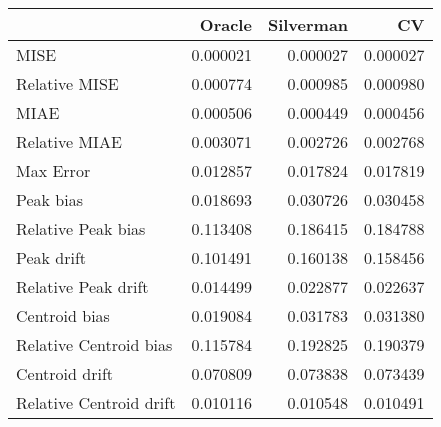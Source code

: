 \begin{tabular}{lrrr}
  \hline
 & Oracle & Silverman & CV \\ 
  \hline
MISE & 0.000021 & 0.000027 & 0.000027 \\ 
  Relative MISE & 0.000774 & 0.000985 & 0.000980 \\ 
  MIAE & 0.000506 & 0.000449 & 0.000456 \\ 
  Relative MIAE & 0.003071 & 0.002726 & 0.002768 \\ 
  Max Error & 0.012857 & 0.017824 & 0.017819 \\ 
  Peak bias & 0.018693 & 0.030726 & 0.030458 \\ 
  Relative Peak bias & 0.113408 & 0.186415 & 0.184788 \\ 
  Peak drift & 0.101491 & 0.160138 & 0.158456 \\ 
  Relative Peak drift & 0.014499 & 0.022877 & 0.022637 \\ 
  Centroid bias & 0.019084 & 0.031783 & 0.031380 \\ 
  Relative Centroid bias & 0.115784 & 0.192825 & 0.190379 \\ 
  Centroid drift & 0.070809 & 0.073838 & 0.073439 \\ 
  Relative Centroid drift & 0.010116 & 0.010548 & 0.010491 \\ 
   \hline
\end{tabular}
